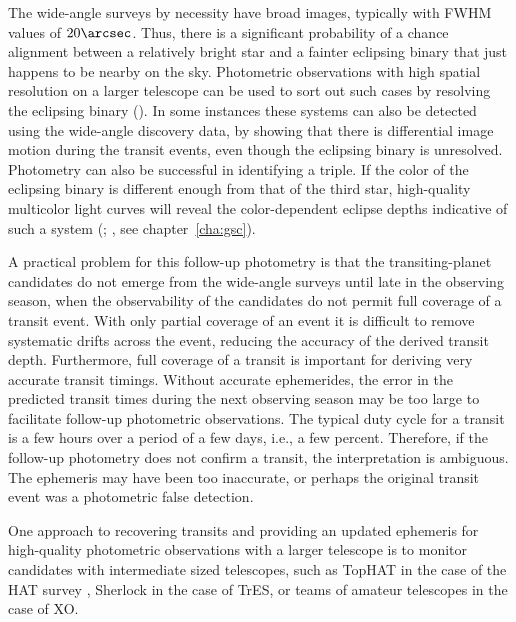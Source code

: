 The wide-angle surveys by necessity have broad images, typically with FWHM values of $20\arcsec$. Thus, there is a significant probability of a chance alignment between a relatively bright star and a fainter eclipsing binary that just happens to be nearby on the sky. Photometric observations with high spatial resolution on a larger telescope can be used to sort out such cases by resolving the eclipsing binary (\citealp[see, e.g.,][]{Charbonneau_Brown_Dunham:AIP:2004a}). In some instances these systems can also be detected using the wide-angle discovery data, by showing that there is differential image motion during the transit events, even though the eclipsing binary is unresolved. Photometry can also be successful in identifying a triple. If the color of the eclipsing binary is different enough from that of the third star, high-quality multicolor light curves will reveal the color-dependent eclipse depths indicative of such a system (\citealp[see, e.g.,][]{Tingley:aa:2004a}; \citealp{ODonovan_Charbonneau_Torres:apj:2006a}, see chapter~\ref{cha:gsc}).

A practical problem for this follow-up photometry is that the transiting-planet candidates do not emerge from the wide-angle surveys until late in the observing season, when the observability of the candidates do not permit full coverage of a transit event. With only partial coverage of an event it is difficult to remove systematic drifts across the event, reducing the accuracy of the derived transit depth. Furthermore, full coverage of a transit is important for deriving very accurate transit timings. Without accurate ephemerides, the error in the predicted transit times during the next observing season may be too large to facilitate follow-up photometric observations. The typical duty cycle for a transit is a few hours over a period of a few days, i.e., a few percent. Therefore, if the follow-up photometry does not confirm a transit, the interpretation is ambiguous. The ephemeris may have been too inaccurate, or perhaps the original transit event was a photometric false detection. 

One approach to recovering transits and providing an updated ephemeris for high-quality photometric observations with a larger telescope is to monitor candidates with intermediate sized telescopes, such as TopHAT in the case of the HAT survey \citep{Bakos_Noyes_Kovacs:pasp:2004a}, Sherlock \citep{Kotredes_Charbonneau_Looper:2004a} in the case of TrES, or teams of amateur telescopes \citep{McCullough_Stys_Valenti:apj:2006a} in the case of XO.

